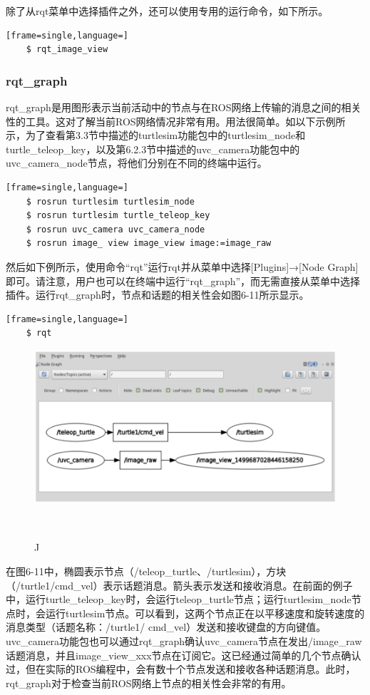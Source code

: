 \documentclass[geye,green,kindle,cn]{elegantnote}
\begin{document}
除了从rqt菜单中选择插件之外，还可以使用专用的运行命令，如下所示。
\begin{lstlisting}[frame=single,language=]
    $ rqt_image_view
\end{lstlisting}
\subsubsection{rqt\_graph}
rqt\_graph是用图形表示当前活动中的节点与在ROS网络上传输的消息之间的相关性的工具。这对了解当前ROS网络情况非常有用。用法很简单。如以下示例所示，为了查看第3.3节中描述的turtlesim功能包中的turtlesim\_node和turtle\_teleop\_key，以及第6.2.3节中描述的uvc\_camera功能包中的uvc\_camera\_node节点，将他们分别在不同的终端中运行。 
\begin{lstlisting}[frame=single,language=]
    $ rosrun turtlesim turtlesim_node 
    $ rosrun turtlesim turtle_teleop_key 
    $ rosrun uvc_camera uvc_camera_node 
    $ rosrun image_ view image_view image:=image_raw
\end{lstlisting}

然后如下例所示，使用命令“rqt”运行rqt并从菜单中选择[Plugins]→[Node Graph]即可。请注意，用户也可以在终端中运行“rqt\_graph”，而无需直接从菜单中选择插件。运行rqt\_graph时，节点和话题的相关性会如图6-11所示显示。
\begin{lstlisting}[frame=single,language=]
    $ rqt
\end{lstlisting} 

\begin{figure}[htbp]
    \centering
    \includegraphics[width=1\linewidth]{src/J.png}
    \centering
    \caption{J} \label{picture:J}
\end{figure}

在图6-11中，椭圆表示节点（/teleop\_turtle、/turtlesim），方块（/turtle1/cmd\_vel）表示话题消息。箭头表示发送和接收消息。在前面的例子中，运行turtle\_teleop\_key时，会运行teleop\_turtle节点；运行turtlesim\_node节点时，会运行turtlesim节点。可以看到，这两个节点正在以平移速度和旋转速度的消息类型（话题名称：/turtle1/ cmd\_vel）发送和接收键盘的方向键值。uvc\_camera功能包也可以通过rqt\_graph确认uvc\_camera节点在发出/image\_raw 话题消息，并且image\_view\_xxx节点在订阅它。这已经通过简单的几个节点确认过，但在实际的ROS编程中，会有数十个节点发送和接收各种话题消息。此时，rqt\_graph对于检查当前ROS网络上节点的相关性会非常的有用。
\end{document}
